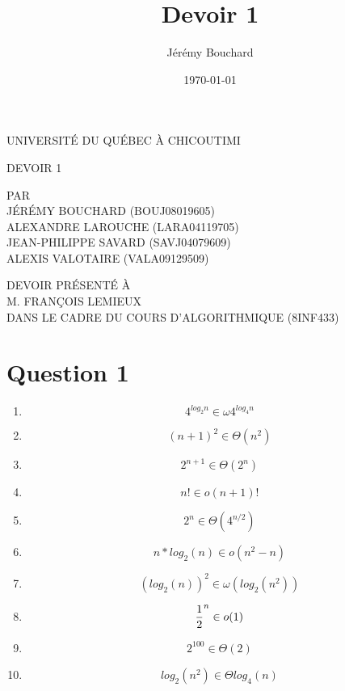 \documentclass[12pt]{article}
\title{Devoir 1}
\author{Jérémy Bouchard}
\date{\today}
\begin{document}
  \begin{titlepage}
    \doublespacing
    \centering

    UNIVERSITÉ DU QUÉBEC À CHICOUTIMI \\

    \vspace{4.7cm}

    DEVOIR 1 \\

    \vspace{4.7cm}

    PAR \\
    JÉRÉMY BOUCHARD (BOUJ08019605) \\
    ALEXANDRE LAROUCHE (LARA04119705) \\
    JEAN-PHILIPPE SAVARD (SAVJ04079609) \\
    ALEXIS VALOTAIRE (VALA09129509) \\

    \vspace{4.7cm}

    DEVOIR PRÉSENTÉ À \\
    M. FRANÇOIS LEMIEUX \\
    DANS LE CADRE DU COURS D'ALGORITHMIQUE (8INF433)

  \end{titlepage}

  \newpage

  \newpage

  \onehalfspacing

  \section*{Question 1}

    \begin{enumerate}[label=(\alph*)]
      \item \[ 4 ^ {log_2 n} \in \omega 4 ^ {log_4 n} \]
      \item \[ (n + 1) ^ {2} \in \Theta (n ^ 2) \]
      \item \[ 2 ^ {n + 1} \in \Theta (2 ^ n) \]
      \item \[ n! \in o (n + 1)! \]
      \item \[ 2 ^ n \in \Theta (4 ^ {n / 2}) \]
      \item \[ n*log_2(n) \in o (n ^ 2 - n) \]
      \item \[ (log_2(n)) ^ 2 \in \omega (log_2(n^2)) \]
      \item \[ {1 \over 2} ^ {n} \in o (1) \]
      \item \[ 2^{100} \in \Theta(2) \]
      \item \[ log_2(n^2) \in \Theta log_4(n) \]
    \end{enumerate}
\end{document}
